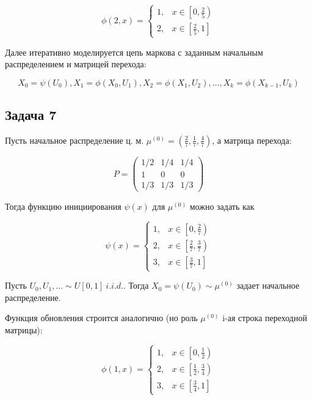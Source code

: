 \documentclass[a4paper,12pt]{article} %
\begin{document}
$$\phi(2, x)=\left\{\begin{array}{ll}
1, & x \in\left[0, \frac{2}{5}\right) \\
2, & x \in\left[\frac{2}{5}, 1\right]
\end{array}\right.$$


Далее итеративно моделируется цепь маркова с заданным начальным распределением и  матрицей перехода:

  $$X_{0}=\psi\left(U_{0}\right), X_{1}=\phi\left(X_{0}, U_{1}\right), X_{2}=\phi\left(X_{1}, U_{2}\right),  \dots, X_{k}=\phi\left(X_{k-1}, U_{k}\right)$$




\subsection*{Задача 7}



Пусть начальное распределение ц. м. 
$\mu^{(0)}=\left(\frac{2}{7}, \frac{1}{7}, \frac{4}{7}\right)$, а матрица перехода: 

$$P=\left(\begin{array}{ccc}
1 / 2 & 1 / 4 & 1 / 4 \\
1 & 0 & 0 \\
1 / 3 & 1 / 3 & 1 / 3
\end{array}\right)$$

Тогда функцию инициирования $\psi(x)$ для $\mu^{(0)}$  можно задать как 

$$\psi(x)=\left\{\begin{array}{ll}
1, & x \in\left[0, \frac{2}{7}\right) \\
2, & x \in\left[\frac{2}{7}, \frac{3}{7}\right) \\
3, & x \in\left[\frac{3}{7}, 1\right]
\end{array}\right.$$

Пусть $U_{0}, U_{1}, \ldots \sim  U[0,1] \ i.i.d.$. 
Тогда  $X_{0}=\psi\left(U_{0}\right) \sim \mu^{(0)}$ задает начальное распределение. 

Функция обновления строится аналогично (но роль  $\mu^{(0)}$ i-ая строка переходной матрицы): 

$$\phi(1, x)=\left\{\begin{array}{ll}
1, & x \in\left[0, \frac{1}{2}\right) \\
2, & x \in\left[\frac{1}{2}, \frac{3}{4}\right) \\
3, & x \in\left[\frac{3}{4}, 1\right]
\end{array}\right.$$
\end{document}
